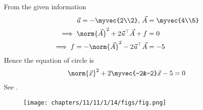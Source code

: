 From the given information
\begin{align}
	\vec{u} = -\myvec{2\\2}, \, \vec{A} &= \myvec{4\\5}\\
\implies	\norm{\vec{A}}^2+2\vec{u}^\top\vec{A}+f &= 0\\
\implies	f = -\norm{\vec{A}}^2 - 2\vec{u}^\top\vec{A}
	&= -5
\end{align}
Hence the equation of circle is 
\begin{align}
	\norm{\vec{x}}^2+2\myvec{-2&-2}\vec{x}-5 = 0 	
\end{align}
See 
.
\begin{figure}[H]
\centering
\texttt{[image: chapters/11/11/1/14/figs/fig.png]}
\caption{}
\label{fig:chapters/11/11/1/14/1}
\end{figure}






